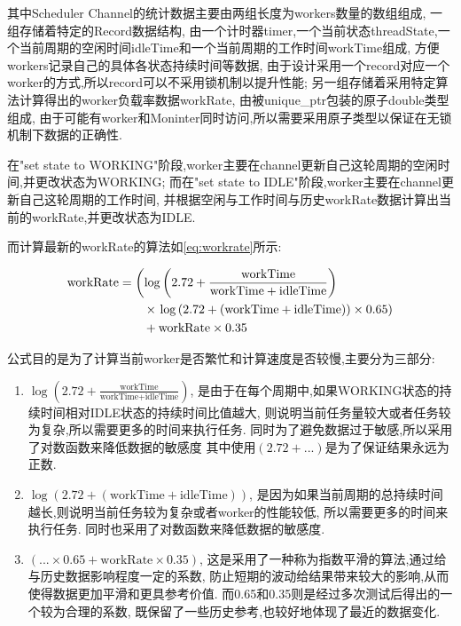 \documentclass{mproj}
\begin{document}
其中Scheduler Channel的统计数据主要由两组长度为workers数量的数组组成,
一组存储着特定的Record数据结构,
由一个计时器timer,一个当前状态threadState,一个当前周期的空闲时间idleTime和一个当前周期的工作时间workTime组成,
方便workers记录自己的具体各状态持续时间等数据,
由于设计采用一个record对应一个worker的方式,所以record可以不采用锁机制以提升性能;
另一组存储着采用特定算法计算得出的worker负载率数据workRate,
由被unique\_ptr包装的原子double类型组成,
由于可能有worker和Moninter同时访问,所以需要采用原子类型以保证在无锁机制下数据的正确性.

在"set state to WORKING"阶段,worker主要在channel更新自己这轮周期的空闲时间,并更改状态为WORKING;
而在"set state to IDLE"阶段,worker主要在channel更新自己这轮周期的工作时间,
并根据空闲与工作时间与历史workRate数据计算出当前的workRate,并更改状态为IDLE.

而计算最新的workRate的算法如\cref{eq:workrate}所示:

\begin{align}
    \text{workRate} & = \left( \log\left( 2.72 + \frac{\text{workTime}}{\text{workTime} + \text{idleTime}} \right) \right. \notag   \\
                    & \qquad \times \left. \log\left( 2.72 + (\text{workTime} + \text{idleTime}) \right) \times 0.65 \right) \notag \\
                    & \qquad + \text{workRate} \times 0.35 \label{eq:workrate}
\end{align}

公式目的是为了计算当前worker是否繁忙和计算速度是否较慢,主要分为三部分:
\begin{enumerate}
    \item $\log\left( 2.72 + \frac{\text{workTime}}{\text{workTime} + \text{idleTime}} \right)$,
          是由于在每个周期中,如果WORKING状态的持续时间相对IDLE状态的持续时间比值越大,
          则说明当前任务量较大或者任务较为复杂,所以需要更多的时间来执行任务.
          同时为了避免数据过于敏感,所以采用了对数函数来降低数据的敏感度
          其中使用$(2.72+...)$是为了保证结果永远为正数.

    \item $\log\left( 2.72 + (\text{workTime} + \text{idleTime}) \right)$,
          是因为如果当前周期的总持续时间越长,则说明当前任务较为复杂或者worker的性能较低,
          所以需要更多的时间来执行任务.
          同时也采用了对数函数来降低数据的敏感度.

    \item $(... \times 0.65 +\text{workRate} \times 0.35)$,
          这是采用了一种称为指数平滑\cite{GARDNER2006637}的算法,通过给与历史数据影响程度一定的系数,
          防止短期的波动给结果带来较大的影响,从而使得数据更加平滑和更具参考价值.
          而0.65和0.35则是经过多次测试后得出的一个较为合理的系数,
          既保留了一些历史参考,也较好地体现了最近的数据变化.
\end{enumerate}
\end{document}
